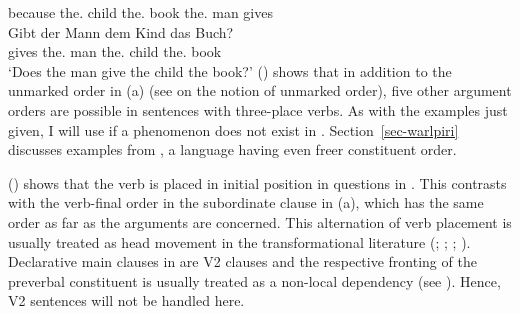 \documentclass[output=paper
	        ,collection
	        ,collectionchapter
 	        ,biblatex
                ,babelshorthands
                ,newtxmath
                ,draftmode
                ,colorlinks, citecolor=brown
]{langscibook}
\begin{document}
     \spacebr{}because the.\DAT{} child the.\ACC{} book the.\NOM{} man  gives\\
\zl
\ea
\gll Gibt der Mann dem Kind das Buch?\\
     gives the.\NOM{} man the.\DAT{} child the.\ACC{} book\\
\glt `Does the man give the child the book?'
\z
() shows that in addition to the unmarked order in (a) (see  on the
notion of unmarked order), five other argument orders are possible in sentences with three-place
verbs. As with the examples just given, I will use  if a phenomenon does not exist in
. Section~\ref{sec-warlpiri} discusses examples from , a language having even freer constituent order.

() shows that the verb is placed in initial position in questions in . This contrasts
with the verb-final order in the subordinate clause in (a), which has the same order as far
as the arguments are concerned. This alternation of verb placement is usually treated as
head movement in the transformational literature (\citealp{Bach62a}; \citealp*[]{Bierwisch63a};
\citealp{Reis74a}; \citealp[Chapter~1]{Thiersch78a}). Declarative main clauses in  are V2
clauses and the respective fronting of the preverbal constituent is usually treated as a non-local dependency (see
). Hence, V2 sentences will not be handled here.
\end{document}
